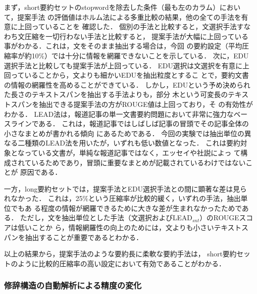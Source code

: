 \documentclass[japanese]{jnlp_1.4}
\begin{document}
まず，short要約セットのstopwordを除去した条件（最も左のカラム）において，提案手法
の評価値はホルム法による多重比較の結果，他の全ての手法を有意に上回っていることを
確認した．
個別の手法と比較すると，文選択手法すなわち文圧縮を一切行わない手法と比較すると，
提案手法が大幅に上回っている事がわかる．これは，文をそのまま抽出する場合は，今回
の要約設定（平均圧縮率が約10\%）では十分に情報を網羅できないことを示している．
次に，EDU選択手法と比較しても提案手法が上回っている．
EDU選択は文選択を有意に上回っていることから，文よりも細かいEDUを抽出粒度とするこ
とで，要約文書の情報の網羅性を高めることができている．
しかし，EDUという予め決められた長さのテキストスパンを抽出する手法よりも，部分
木という可変長のテキストスパンを抽出できる提案手法の方がROUGE値は上回っており，そ
の有効性がわかる．
LEAD法は，報道記事の単一文書要約問題において非常に強力なベースラインである．
これは，報道記事ではしばしば記事の冒頭でその記事全体の小さなまとめが書かれる傾向
にあるためである．
今回の実験では抽出単位の異なる二種類のLEAD法を用いたが，いずれも低い数値となった．
これは要約対象となっている文書が，単純な報道記事ではなく，エッセイや社説によっ
て構成されているためであり，冒頭に重要なまとめが記載されているわけではないことが
原因である．

一方，long要約セットでは，提案手法とEDU選択手法との間に顕著な差は見られなかった．
これは，25\%という圧縮率が比較的緩く，いずれの手法，抽出単位でもあ
る程度の情報が網羅できるために大きな差が生まれなかったためである．
ただし，文を抽出単位とした手法（文選択およびLEAD$_{snt}$）のROUGEスコアは低いことか
ら，情報網羅性の向上のためには，文よりも小さいテキストスパンを抽出することが重要であるとわかる．

以上の結果から，提案手法のような要約長に柔軟な要約手法は，
short要約セットのように比較的圧縮率の高い設定において有効であることがわかる．


\subsubsection{修辞構造の自動解析による精度の変化}
\end{document}
